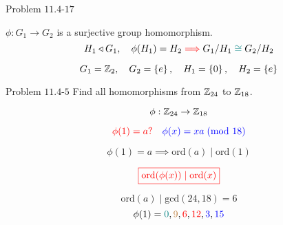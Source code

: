 \begin{frame}
  \begin{exampleblock}{Problem $11.4$-$17$}
	\begin{center}
	  $\phi: G_1 \to G_2$ is a surjective group homomorphism.
	  \[
		H_1 \triangleleft G_1, \quad \phi(H_1) = H_2 \textcolor{red}{\implies} G_1/H_1 \;\textcolor{teal}{\cong}\; G_2/H_2
	  \]
	\end{center}
  \end{exampleblock}

  \pause

  \[
	G_1 = \mathbb{Z}_{2},\quad G_2 = \left\{e\right\},\quad H_1 = \left\{0\right\},\quad H_2 = \left\{e\right\}
  \]
\end{frame}

\begin{frame}
  \begin{exampleblock}{Problem $11.4$-$5$}
	Find all homomorphisms from $\mathbb{Z}_{24}$ to $\mathbb{Z}_{18}$.
  \end{exampleblock}

  \[
	\phi: \mathbb{Z}_{24} \to \mathbb{Z}_{18}
  \]

  \pause
  \[
	\textcolor{red}{\phi(1) = a?} \quad \textcolor{blue}{\phi(x) = xa \; (\text{mod } 18)}
  \]

  \pause
  \[
	\phi(1) = a \implies \text{ord}(a) \mid \text{ord}(1)
  \]

  \pause
  \begin{theorem}
	\[
	  \textcolor{red}{\boxed{\text{ord}(\phi(x)) \mid \text{ord}(x)}}
	\]
  \end{theorem}

  \pause
  \[
	\text{ord}(a) \mid \text{gcd}(24, 18) = 6
  \]
  \pause
  \[
	\phi(1) = \textcolor{teal}{0}, \textcolor{brown}{9}, \textcolor{red}{6}, \textcolor{red}{12}, \textcolor{blue}{3}, \textcolor{blue}{15}
  \]
\end{frame}
